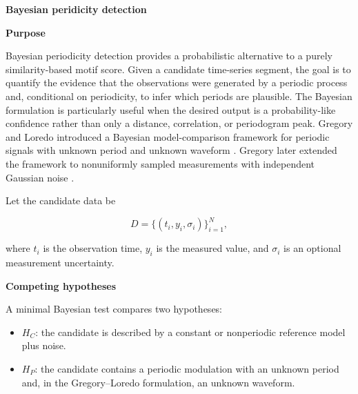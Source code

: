 \documentclass{book}
\providecommand{\ProjectDeepHeading}[2]{%
    \par\medskip\noindent\textbf{#2}\par\smallskip
}
\begin{document}
\ProjectDeepHeading{1}{Bayesian peridicity detection}



\ProjectDeepHeading{4}{Purpose}

Bayesian periodicity detection provides a probabilistic alternative to a purely similarity-based motif score. Given a candidate time-series segment, the goal is to quantify the evidence that the observations were generated by a periodic process and, conditional on periodicity, to infer which periods are plausible. The Bayesian formulation is particularly useful when the desired output is a probability-like confidence rather than only a distance, correlation, or periodogram peak. Gregory and Loredo introduced a Bayesian model-comparison framework for periodic signals with unknown period and unknown waveform \citep{gregory-1992-a-new-method-for-the-detection-of-a-periodic-signal-of-unknown-shape-and-period}. Gregory later extended the framework to nonuniformly sampled measurements with independent Gaussian noise \citep{gregory-1999-bayesian-periodic-signal-detection-i-analysis-of-20-years-of-radio-flux-measurements-of-the-x-ray-binary-ls-i-plus-61-303}.

Let the candidate data be

\begin{equation}
D = \{(t_i,y_i,\ensuremath{\sigma}_i)\}_{i=1}^{N},
\end{equation}

where $t_i$ is the observation time, $y_i$ is the measured value, and $\ensuremath{\sigma}_i$ is an optional measurement uncertainty.

\ProjectDeepHeading{4}{Competing hypotheses}

A minimal Bayesian test compares two hypotheses:

\begin{itemize}

    \item $H_C$: the candidate is described by a constant or nonperiodic reference model plus noise.

    \item $H_P$: the candidate contains a periodic modulation with an unknown period and, in the Gregory--Loredo formulation, an unknown waveform.

\end{itemize}
\end{document}
